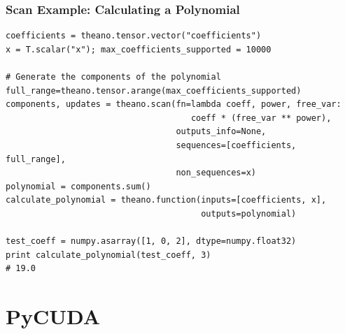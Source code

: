 \documentclass[a4paper,9pt]{beamer}
\begin{document}
\begin{frame}[fragile]
\frametitle{Scan Example: Calculating a Polynomial}
\begin{Verbatim}
coefficients = theano.tensor.vector("coefficients")
x = T.scalar("x"); max_coefficients_supported = 10000

# Generate the components of the polynomial
full_range=theano.tensor.arange(max_coefficients_supported)
components, updates = theano.scan(fn=lambda coeff, power, free_var: 
                                     coeff * (free_var ** power),
                                  outputs_info=None,
                                  sequences=[coefficients, full_range],
                                  non_sequences=x)
polynomial = components.sum()
calculate_polynomial = theano.function(inputs=[coefficients, x],
                                       outputs=polynomial)

test_coeff = numpy.asarray([1, 0, 2], dtype=numpy.float32)
print calculate_polynomial(test_coeff, 3)
# 19.0
\end{Verbatim}
\end{frame}


\section{PyCUDA}
\end{document}
